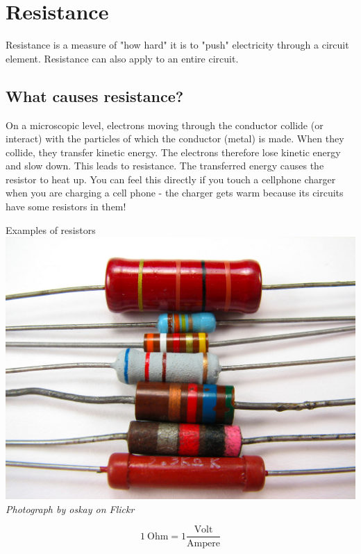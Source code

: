 \section{Resistance}

Resistance is a measure of "how hard" it is to "push" electricity through a circuit element. Resistance can also apply to an entire circuit.

\subsection*{What causes resistance?}

\begin{minipage}{.5\textwidth}
On a microscopic level, electrons moving through
the conductor collide (or interact) with the particles of which the conductor
(metal) is made. When they collide, they transfer kinetic energy. 
The electrons therefore lose kinetic energy and slow down. This leads to
resistance. The transferred energy causes the resistor to heat up.
You can feel this directly if you touch a cellphone charger when you are charging a cell phone - the charger gets warm because its circuits have some resistors in them!
\end{minipage}
\begin{minipage}{.5\textwidth}
\begin{center}
 Examples of resistors\\
\includegraphics[width=.8\textwidth]{photos/resistors_oskay.jpg}\\
\textit{Photograph by oskay on Flickr}
\end{center}
\end{minipage}

\begin{equation*}
1 \ \text{Ohm} = 1 \frac{\text{Volt}}{ \text{Ampere}}
\end{equation*}

